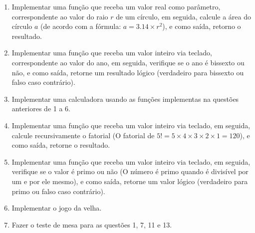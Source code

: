 \documentclass[11pt]{article}
\begin{document}
\begin{enumerate}
	\item Implementar uma função que receba um valor real como parâmetro, correspondente ao valor
	do raio $r$ de um círculo, em seguida, calcule a área do círculo $a$ (de acordo com a fórmula:
	$a = 3.14 × r^{2}$), e como saída, retorno o resultado.
	
	\item Implementar uma função que receba um valor inteiro via teclado, correspondente ao valor do
	ano, em seguida, verifique se o ano é bissexto ou não, e como saída, retorne um resultado lógico
	(verdadeiro para bissexto ou falso caso contrário).
	
	\item  Implementar uma calculadora usando as funções implementas na questões anteriores de 1 a 6.
	
	\item Implementar uma função que receba um valor inteiro via teclado, em seguida, calcule
	recursivamente o fatorial (O fatorial de $5! = 5 \times 4 \times 3 \times 2 \times 1 = 120$), e como saída, retorne o
	resultado.
	
	\item  Implementar uma função que receba um valor inteiro via teclado, em seguida, verifique se o valor
	é primo ou não (O número é primo quando é divisível por um e por ele mesmo), e como saída,
	retorne um valor lógico (verdadeiro para primo ou falso caso contrário).
	
	\item Implementar o jogo da velha.
	
	\item Fazer o teste de mesa para as questões 1, 7, 11 e 13.
\end{enumerate}
\end{document}
